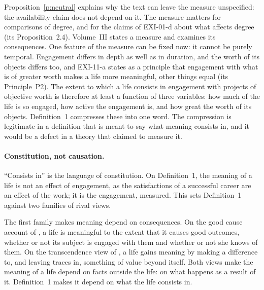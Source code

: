 Proposition~\ref{p:neutral} explains why the text can leave the measure unspecified: the availability claim does not depend on it. The measure matters for comparisons of degree, and for the claims of EXI-01-d about what affects degree (its Proposition~2.4). Volume~III states a measure and examines its consequences. One feature of the measure can be fixed now: it cannot be purely temporal. Engagement differs in depth as well as in duration, and the worth of its objects differs too, and EXI-11-a states as a principle that engagement with what is of greater worth makes a life more meaningful, other things equal (its Principle~P2). The extent to which a life consists in engagement with projects of objective worth is therefore at least a function of three variables: how much of the life is so engaged, how active the engagement is, and how great the worth of its objects. Definition~1 compresses these into one word. The compression is legitimate in a definition that is meant to say what meaning consists in, and it would be a defect in a theory that claimed to measure it.


\paragraph{Constitution, not causation.} \enquote{Consists in} is the language of constitution. On Definition~1, the meaning of a life is not an effect of engagement, as the satisfactions of a successful career are an effect of the work; it is the engagement, measured. This sets Definition~1 against two families of rival views.

The first family makes meaning depend on consequences. On the good cause account of \citet{Smuts2013}, a life is meaningful to the extent that it causes good outcomes, whether or not its subject is engaged with them and whether or not she knows of them. On the transcendence view of \citet{Nozick1981}, a life gains meaning by making a difference to, and leaving traces in, something of value beyond itself. Both views make the meaning of a life depend on facts outside the life: on what happens as a result of it. Definition~1 makes it depend on what the life consists in.

